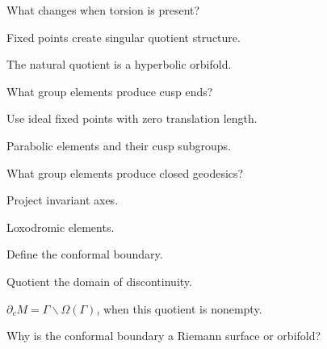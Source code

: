 \begin{exercise}\label{exr:vii37-18}
What changes when torsion is present?
\end{exercise}

\begin{hint}
Fixed points create singular quotient structure.
\end{hint}

\begin{solution}
The natural quotient is a hyperbolic orbifold.
\end{solution}

\begin{exercise}\label{exr:vii37-19}
What group elements produce cusp ends?
\end{exercise}

\begin{hint}
Use ideal fixed points with zero translation length.
\end{hint}

\begin{solution}
Parabolic elements and their cusp subgroups.
\end{solution}

\begin{exercise}\label{exr:vii37-20}
What group elements produce closed geodesics?
\end{exercise}

\begin{hint}
Project invariant axes.
\end{hint}

\begin{solution}
Loxodromic elements.
\end{solution}

\begin{exercise}\label{exr:vii37-21}
Define the conformal boundary.
\end{exercise}

\begin{hint}
Quotient the domain of discontinuity.
\end{hint}

\begin{solution}
\(\partial_cM=\Gamma\backslash\Omega(\Gamma)\), when this quotient is nonempty.
\end{solution}

\begin{exercise}\label{exr:vii37-22}
Why is the conformal boundary a Riemann surface or orbifold?
\end{exercise}

